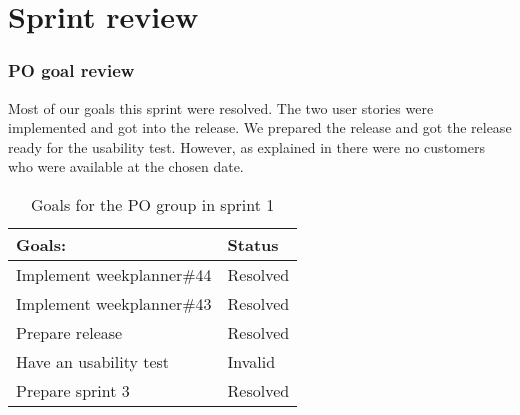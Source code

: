 \section{Sprint review}


\subsubsection{PO goal review}
Most of our goals this sprint were resolved.
The two user stories were implemented and got into the release. 
We prepared the release and got the release ready for the usability test.
However, as explained in  there were no customers who were available at the chosen date.


\begin{table}[H]
    \centering
    \begin{tabular}{|l|l|}
    \hline
    Goals:                                   & Status \\ \hline
    Implement weekplanner\#44                & Resolved  \\ \hline
    Implement weekplanner\#43                & Resolved  \\ \hline
    Prepare release                          & Resolved \\ \hline
    Have an usability test                   & Invalid \\ \hline
    Prepare sprint 3                         & Resolved \\ \hline
    \end{tabular}
    \caption{Goals for the PO group in sprint 1}
    \label{PO-goal-sprint-2-review}
\end{table}